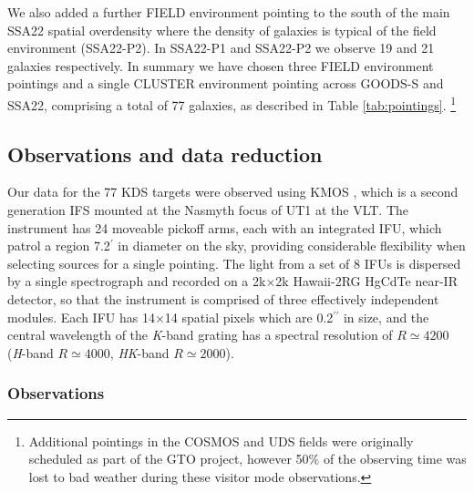 \documentclass[fleqn,usenatbib]{mnras}
\begin{document}
We also added a further FIELD environment pointing to the south of the main SSA22 spatial overdensity where the density of galaxies is typical of the field environment (SSA22-P2).
In SSA22-P1 and SSA22-P2 we observe 19 and 21 galaxies respectively.
In summary we have chosen three FIELD environment pointings and a single CLUSTER environment pointing across GOODS-S and SSA22, comprising a total of 77 galaxies, as described in Table \ref{tab:pointings}. \footnote{Additional pointings in the COSMOS and UDS fields were originally scheduled as part of the GTO project, however 50$\%$ of the observing time was lost to bad weather during these visitor mode observations.}

\subsection{Observations and data reduction}\label{subsubsec:observations_and_dr}

Our data for the 77 KDS targets were observed using KMOS \citep{Sharples2013}, which is a second generation IFS mounted at the Nasmyth focus of UT1 at the VLT.
The instrument has 24 moveable pickoff arms, each with an integrated IFU, which patrol a region 7.2$^{\prime}$ in diameter on the sky, providing considerable flexibility when selecting sources for a single pointing.
The light from a set of 8 IFUs is dispersed by a single spectrograph and recorded on a 2k$\times$2k Hawaii-2RG HgCdTe near-IR detector, so that the instrument is comprised of three effectively independent modules.
Each IFU has 14$\times$14 spatial pixels which are 0.2$^{\prime\prime}$ in size, and the central wavelength of the {\it K}-band grating has a spectral resolution of $R\simeq4200$ ({\it H}-band $R\simeq4000$, {\it HK}-band $R\simeq2000$).
\subsubsection{Observations}\label{subsubsec:Obs}
\end{document}
